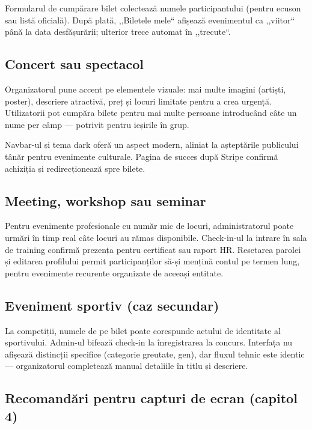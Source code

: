 Formularul de cumpărare bilet colectează numele participantului (pentru ecuson sau listă oficială). După plată, ,,Biletele mele`` afișează evenimentul ca ,,viitor`` până la data desfășurării; ulterior trece automat în ,,trecute``.

\subsection{Concert sau spectacol}

Organizatorul pune accent pe elementele vizuale: mai multe imagini (artiști, poster), descriere atractivă, preț și locuri limitate pentru a crea urgență. Utilizatorii pot cumpăra bilete pentru mai multe persoane introducând câte un nume per câmp — potrivit pentru ieșirile în grup.

Navbar-ul și tema dark oferă un aspect modern, aliniat la așteptările publicului tânăr pentru evenimente culturale. Pagina de succes după Stripe confirmă achiziția și redirecționează spre bilete.

\subsection{Meeting, workshop sau seminar}

Pentru evenimente profesionale cu număr mic de locuri, administratorul poate urmări în timp real câte locuri au rămas disponibile. Check-in-ul la intrare în sala de training confirmă prezența pentru certificat sau raport HR. Resetarea parolei și editarea profilului permit participanților să-și mențină contul pe termen lung, pentru evenimente recurente organizate de aceeași entitate.

\subsection{Eveniment sportiv (caz secundar)}

La competiții, numele de pe bilet poate corespunde actului de identitate al sportivului. Admin-ul bifează check-in la înregistrarea la concurs. Interfața nu afișează distincții specifice (categorie greutate, gen), dar fluxul tehnic este identic — organizatorul completează manual detaliile în titlu și descriere.

\subsection{Recomandări pentru capturi de ecran (capitol 4)}

